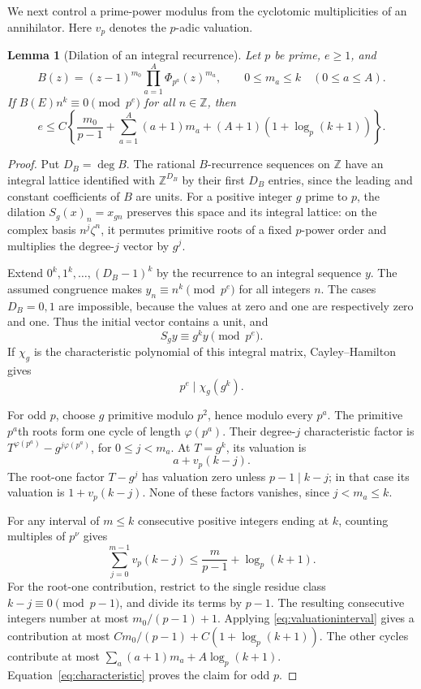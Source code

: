 \documentclass[11pt]{amsart}
\numberwithin{equation}{section}
\newtheorem{lemma}[theorem]{Lemma}
\theoremstyle{remark}
\newcommand{\Z}{\mathbb Z}
\begin{document}
We next control a prime-power modulus from the cyclotomic multiplicities
of an annihilator. Here \(v_p\) denotes the \(p\)-adic valuation.

\begin{lemma}[Dilation of an integral recurrence]\label{lem:dilation}
Let \(p\) be prime, \(e\ge1\), and
\[
 B(z)=(z-1)^{m_0}\prod_{a=1}^A\Phi_{p^a}(z)^{m_a},
 \qquad 0\le m_a\le k\quad(0\le a\le A).
\]
If \(B(E)n^k\equiv0\pmod {p^e}\) for all \(n\in\Z\), then
\begin{equation}\label{eq:dilation}
 e\le C\left\{\frac{m_0}{p-1}
       +\sum_{a=1}^A(a+1)m_a
       +(A+1)(1+\log_p(k+1))\right\}.
\end{equation}
\end{lemma}
\begin{proof}
Put \(D_B=\deg B\). The rational \(B\)-recurrence sequences on
\(\Z\) have an integral lattice identified with \(\Z^{D_B}\) by their
first \(D_B\) entries, since the leading and constant coefficients
of \(B\) are units.
For a positive integer \(g\) prime to \(p\), the dilation
\(S_g(x)_n=x_{gn}\) preserves this space and its integral lattice:
on the complex basis \(n^j\zeta^n\), it permutes primitive roots of a
fixed \(p\)-power order and multiplies the degree-\(j\) vector by \(g^j\).

Extend \(0^k,1^k,\ldots,(D_B-1)^k\) by the recurrence to an integral
sequence \(y\). The assumed congruence makes \(y_n\equiv n^k\pmod {p^e}\)
for all integers \(n\). The cases \(D_B=0,1\) are impossible, because
the values at zero and one are respectively zero and one.
Thus the initial vector contains a unit, and
\[
 S_g y\equiv g^k y\pmod {p^e}.
\]
If \(\chi_g\) is the characteristic polynomial of this integral
matrix, Cayley--Hamilton gives
\begin{equation}\label{eq:characteristic}
 p^e\mid\chi_g(g^k).
\end{equation}

For odd \(p\), choose \(g\) primitive modulo \(p^2\), hence modulo
every \(p^a\). The primitive \(p^a\)th roots form one cycle of length
\(\varphi(p^a)\). Their degree-\(j\) characteristic factor is
\(T^{\varphi(p^a)}-g^{j\varphi(p^a)}\), for \(0\le j<m_a\).
At \(T=g^k\), its valuation is
\[
 a+v_p(k-j).
\]
The root-one factor \(T-g^j\) has valuation zero unless \(p-1\mid k-j\);
in that case its valuation is \(1+v_p(k-j)\).
None of these factors vanishes, since \(j<m_a\le k\).

For any interval of \(m\le k\) consecutive positive integers ending
at \(k\), counting multiples of \(p^\nu\) gives
\begin{equation}\label{eq:valuationinterval}
 \sum_{j=0}^{m-1}v_p(k-j)
 \le \frac m{p-1}+\log_p(k+1).
\end{equation}
For the root-one contribution, restrict to the single residue class
\(k-j\equiv0\pmod {p-1}\), and divide its terms by \(p-1\).
The resulting consecutive integers number at most \(m_0/(p-1)+1\).
Applying \eqref{eq:valuationinterval} gives a contribution at most
\(C m_0/(p-1)+C(1+\log_p(k+1))\).
The other cycles contribute at most
\(\sum_a(a+1)m_a+A\log_p(k+1)\).
Equation~\eqref{eq:characteristic} proves the claim for odd \(p\).


\end{proof}
\end{document}

